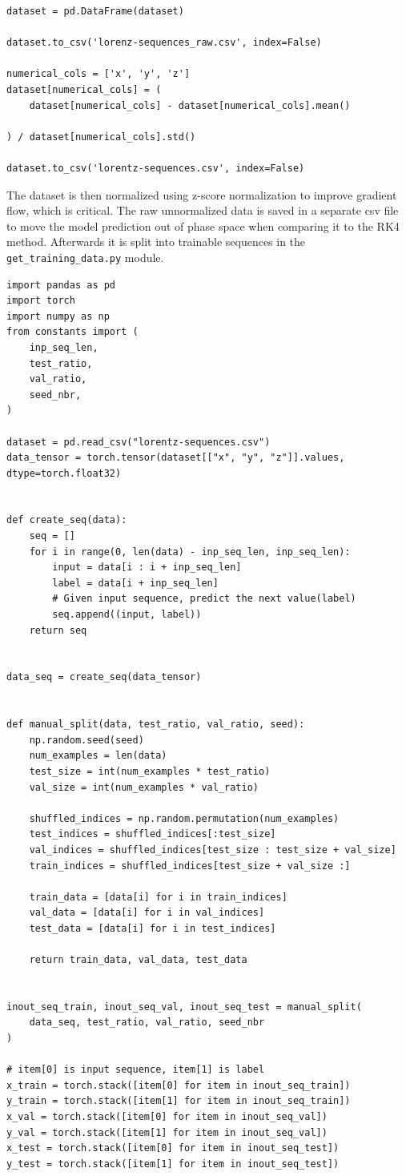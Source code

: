 \documentclass[11pt]{article}
\begin{document}
\begin{lstlisting}
dataset = pd.DataFrame(dataset)

dataset.to_csv('lorenz-sequences_raw.csv', index=False)

numerical_cols = ['x', 'y', 'z']
dataset[numerical_cols] = (
    dataset[numerical_cols] - dataset[numerical_cols].mean()

) / dataset[numerical_cols].std()

dataset.to_csv('lorentz-sequences.csv', index=False)
\end{lstlisting}

The dataset is then normalized using z-score normalization to improve gradient flow, which is critical. The raw unnormalized data is saved in a separate csv file to move the model prediction out of phase space when comparing it to the RK4 method. Afterwards it is split into trainable sequences in the \texttt{get\_training\_data.py} module.
\begin{lstlisting}
import pandas as pd
import torch
import numpy as np
from constants import (
    inp_seq_len,
    test_ratio,
    val_ratio,
    seed_nbr,
)

dataset = pd.read_csv("lorentz-sequences.csv")
data_tensor = torch.tensor(dataset[["x", "y", "z"]].values, dtype=torch.float32)


def create_seq(data):
    seq = []
    for i in range(0, len(data) - inp_seq_len, inp_seq_len):
        input = data[i : i + inp_seq_len]
        label = data[i + inp_seq_len]
        # Given input sequence, predict the next value(label)
        seq.append((input, label))
    return seq


data_seq = create_seq(data_tensor)


def manual_split(data, test_ratio, val_ratio, seed):
    np.random.seed(seed)
    num_examples = len(data)
    test_size = int(num_examples * test_ratio)
    val_size = int(num_examples * val_ratio)

    shuffled_indices = np.random.permutation(num_examples)
    test_indices = shuffled_indices[:test_size]
    val_indices = shuffled_indices[test_size : test_size + val_size]
    train_indices = shuffled_indices[test_size + val_size :]

    train_data = [data[i] for i in train_indices]
    val_data = [data[i] for i in val_indices]
    test_data = [data[i] for i in test_indices]

    return train_data, val_data, test_data


inout_seq_train, inout_seq_val, inout_seq_test = manual_split(
    data_seq, test_ratio, val_ratio, seed_nbr
)

# item[0] is input sequence, item[1] is label
x_train = torch.stack([item[0] for item in inout_seq_train])
y_train = torch.stack([item[1] for item in inout_seq_train])
x_val = torch.stack([item[0] for item in inout_seq_val])
y_val = torch.stack([item[1] for item in inout_seq_val])
x_test = torch.stack([item[0] for item in inout_seq_test])
y_test = torch.stack([item[1] for item in inout_seq_test])
\end{lstlisting}
\end{document}
